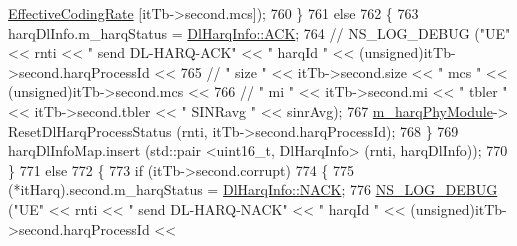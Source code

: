 \begin{DoxyCode}
      \hyperlink{namespacens3_af70af4887722b3badf3d57ca573d9502}{EffectiveCodingRate} [itTb->second.mcs]);
760                                                         \}
761                                                         \textcolor{keywordflow}{else}
762                                                         \{
763                                                                 harqDlInfo.m\_harqStatus = 
      \hyperlink{structns3_1_1DlHarqInfo_a922d2bc13ae01f93cde1a8b4bfccad14a8d3ab99ad8902cfbc5929336966de3ef}{DlHarqInfo::ACK};
764 \textcolor{comment}{//                                                              NS\_LOG\_DEBUG ("UE" << rnti << " send
       DL-HARQ-ACK" << " harqId " << (unsigned)itTb->second.harqProcessId <<}
765 \textcolor{comment}{//                                                                                                                      
      " size " << itTb->second.size << " mcs " << (unsigned)itTb->second.mcs <<}
766 \textcolor{comment}{//                                                                                                                      
      " mi " << itTb->second.mi << " tbler " << itTb->second.tbler << " SINRavg " << sinrAvg);}
767                                                                 \hyperlink{classns3_1_1MmWaveSpectrumPhy_a88d377424f8b4ca9745807ef3281e010}{m\_harqPhyModule}->
      ResetDlHarqProcessStatus (rnti, itTb->second.harqProcessId);
768                                                         \}
769                                                         harqDlInfoMap.insert (std::pair <uint16\_t,
       DlHarqInfo> (rnti, harqDlInfo));
770                                                 \}
771                                                 \textcolor{keywordflow}{else}
772                                                 \{
773                                                         \textcolor{keywordflow}{if} (itTb->second.corrupt)
774                                                         \{
775                                                                 (*itHarq).second.m\_harqStatus = 
      \hyperlink{structns3_1_1DlHarqInfo_a922d2bc13ae01f93cde1a8b4bfccad14ae0560b883a5e22a4d4c40ac562e80374}{DlHarqInfo::NACK};
776                                                                 \hyperlink{group__logging_ga413f1886406d49f59a6a0a89b77b4d0a}{NS\_LOG\_DEBUG} (\textcolor{stringliteral}{"UE"} << rnti << \textcolor{stringliteral}{"
       send DL-HARQ-NACK"} << \textcolor{stringliteral}{" harqId "} << (\textcolor{keywordtype}{unsigned})itTb->second.harqProcessId <<

\end{DoxyCode}
